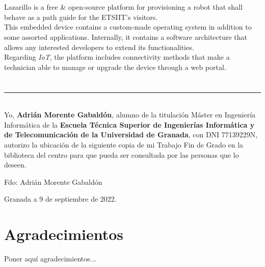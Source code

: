 \\

\vspace{0.7cm}
\\

Lazarillo is a free \& open-source platform for provisioning a robot that shall behave as a path guide for the ETSIIT's visitors.\\

This embedded device contains a custom-made operating system in addition to some assorted applications. Internally, it contains a software architecture that allows any interested developers to extend its functionalities.\\

Regarding \textit{IoT}, the platform includes connectivity methods that make a technician able to manage or upgrade the device through a web portal.

\chapter*{}
\thispagestyle{empty}

\noindent\rule[-1ex]{\textwidth}{2pt}\\[4.5ex]

Yo, \textbf{Adrián Morente Gabaldón}, alumno de la titulación Máster en Ingeniería Informática de la \textbf{Escuela Técnica Superior de Ingenierías Informática y de Telecomunicación de la Universidad de Granada}, con DNI 77139229N, autorizo la ubicación de la siguiente copia de mi Trabajo Fin de Grado en la biblioteca del centro para que pueda ser consultada por las personas que lo deseen.

\vspace{6cm}

\noindent Fdo: Adrián Morente Gabaldón

\vspace{2cm}

\begin{flushright}
Granada a 9 de septiembre de 2022.
\end{flushright}

\chapter*{Agradecimientos}
\thispagestyle{empty}

       \vspace{1cm}


Poner aquí agradecimientos...

